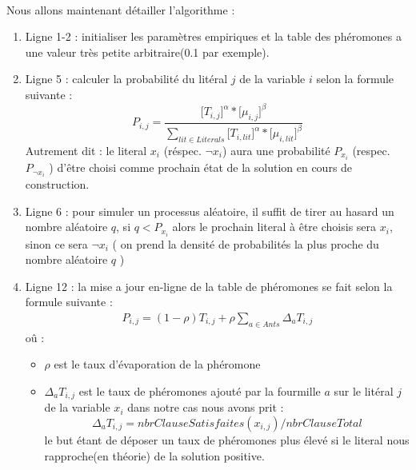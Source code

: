 	\paragraph{}Nous allons maintenant détailler l'algorithme : 
	\begin{enumerate}
		\item Ligne 1-2 : initialiser les paramètres empiriques et la table des phéromones a une valeur très petite arbitraire(0.1 par exemple).
		\item Ligne 5 : calculer la probabilité du litéral $j$ de la variable $i$ selon la formule suivante : \\
		\begin{equation}
			P_{i,j} = \frac{\lbrack T_{i,j} \rbrack^{\alpha}* \lbrack\mu_{i,j}\rbrack^{\beta}}{\sum\limits_{lit \in Literals}{\lbrack T_{i,lit} \rbrack^{\alpha}* \lbrack\mu_{i,lit}\rbrack^{\beta}}}
		\end{equation}
		Autrement dit : le literal $x_{i}$ (réspec. $\lnot x_{i}$) aura une probabilité $P_{x_{i}}$ (respec. $P_{\lnot x_{i}}$ ) d'être choisi comme prochain état de la solution en cours de construction.
		
		\item Ligne 6 : pour simuler un processus aléatoire, il suffit de tirer au hasard un nombre aléatoire $q$, si $q < P_{x_{i}}$ alors le prochain literal à être choisis sera $x_i$, sinon ce sera $\lnot x_i$ ( on prend la densité de probabilités la plus proche du nombre aléatoire $q$ )
		
		
		\item Ligne 12 : la mise a jour en-ligne de la table de phéromones se fait selon la formule suivante : 
		\begin{eqnarray}
			P_{i,j} = (1-\rho)T_{i,j} + \rho \sum_{a \in Ants}{\Delta_a T_{i,j}}
		\end{eqnarray}
		\newpage
		oû : 
		\begin{itemize}
			\item $\rho$ est le taux d'évaporation de la phéromone
			\item $\Delta_a T_{i,j}$ est le taux de phéromones ajouté par la fourmille $a$ sur le litéral $j$ de la variable $x_i$
			dans notre cas nous avons prit : \\
			\begin{equation}
				\Delta_a T_{i,j} = nbrClauseSatisfaites(x_{i,j})/nbrClauseTotal
			\end{equation}
			le but étant de déposer un taux de phéromones plus élevé si le literal nous rapproche(en théorie) de la solution positive.
		\end{itemize}
	\end{enumerate}
	
